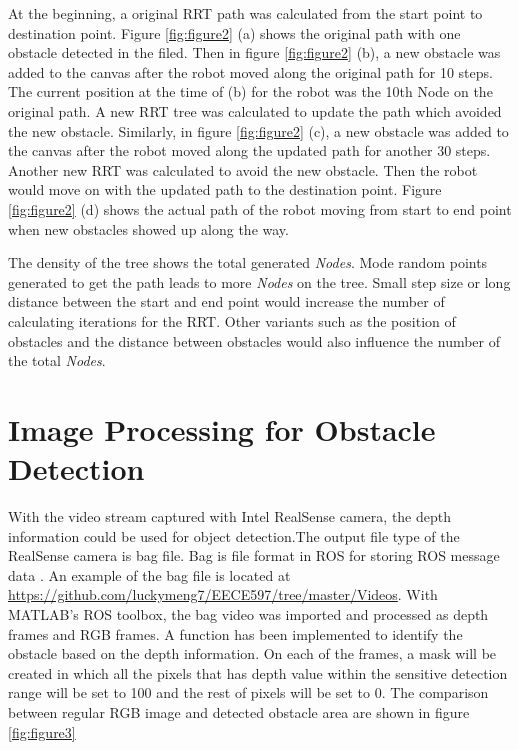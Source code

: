 \documentclass[
  oneside]{ubcthesis}
\begin{document}
At the beginning, a original RRT path was calculated from the start point to destination point. Figure \ref{fig:figure2} (a) shows the original path with one obstacle detected in the filed. Then in figure \ref{fig:figure2} (b), a new obstacle was added to the canvas after the robot moved along the original path for 10 steps. The current position at the time of (b) for the robot was the 10th Node on the original path. A new RRT tree was calculated to update the path which avoided the new obstacle. Similarly, in figure \ref{fig:figure2} (c), a new obstacle was added to the canvas after the robot moved along the updated path for another 30 steps. Another new RRT was calculated to avoid the new obstacle. Then the robot would move on with the updated path to the destination point. Figure \ref{fig:figure2} (d) shows the actual path of the robot moving from start to end point when new obstacles showed up along the way.

The density of the tree shows the total generated \emph{Nodes}. Mode random points generated to get the path leads to more \emph{Nodes} on the tree. Small step size or long distance between the start and end point would increase the number of calculating iterations for the RRT. Other variants such as the position of obstacles and the distance between obstacles would also influence the number of the total \emph{Nodes}.

\hypertarget{image-processing-for-obstacle-detection}{%
\section{Image Processing for Obstacle Detection}\label{image-processing-for-obstacle-detection}}

With the video stream captured with Intel RealSense camera, the depth information could be used for object detection.The output file type of the RealSense camera is bag file. Bag is file format in ROS for storing ROS message data \citep{bag}. An example of the bag file is located at \url{https://github.com/luckymeng7/EECE597/tree/master/Videos}. With MATLAB's ROS toolbox, the bag video was imported and processed as depth frames and RGB frames. A function has been implemented to identify the obstacle based on the depth information. On each of the frames, a mask will be created in which all the pixels that has depth value within the sensitive detection range will be set to 100 and the rest of pixels will be set to 0. The comparison between regular RGB image and detected obstacle area are shown in figure \ref{fig:figure3}
\end{document}
